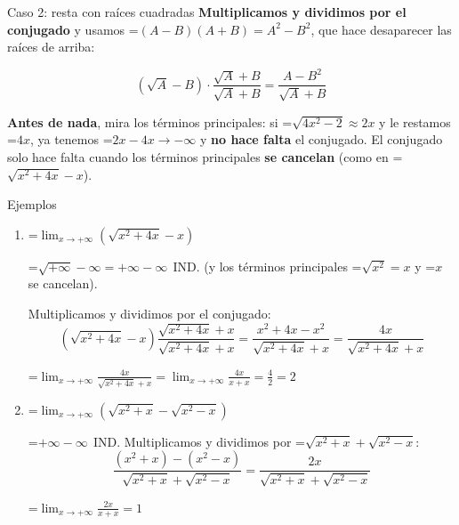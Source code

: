 \documentclass[11pt,a4paper]{article}
\newcommand{\fmm}[1]{\setbox0=\hbox{$#1$}\ifdim\wd0>\linewidth\[#1\]\else\mbox{\box0}\fi}
\newcommand{\fmuline}[1]{\textbf{\color{fmaccent}#1}}
\begin{document}
  
\begin{fmdef}{Caso 2: resta con raíces cuadradas}
\textbf{Multiplicamos y dividimos por el conjugado} y usamos \fmm{(A-B)(A+B)=A^2-B^2}, que hace desaparecer las raíces de arriba:

      
\[\left(\sqrt{A}-B\right)\cdot\frac{\sqrt{A}+B}{\sqrt{A}+B}=\frac{A-B^2}{\sqrt{A}+B}\]

      
\begin{fmnote}\fmuline{Antes de nada}, mira los términos principales: si \fmm{\sqrt{4x^2-2}\approx2x} y le restamos \fmm{4x}, ya tenemos \fmm{2x-4x\to-\infty} y \textbf{no hace falta} el conjugado. El conjugado solo hace falta cuando los términos principales \textbf{se cancelan} (como en \fmm{\sqrt{x^2+4x}-x}).\end{fmnote}
\end{fmdef}

  
\begin{fmex}{Ejemplos}
\begin{enumerate}[label=\textbf{\arabic*.},leftmargin=*]
\item \fmm{\displaystyle\lim_{x\to+\infty}\left(\sqrt{x^2+4x}-x\right)}
          

            

\fmm{\sqrt{+\infty}-\infty=+\infty-\infty\ \ \text{IND.}} (y los términos principales \fmm{\sqrt{x^2}=x} y \fmm{x} se cancelan).

            

Multiplicamos y dividimos por el conjugado: 
\[\left(\sqrt{x^2+4x}-x\right)\frac{\sqrt{x^2+4x}+x}{\sqrt{x^2+4x}+x}=\frac{x^2+4x-x^2}{\sqrt{x^2+4x}+x}=\frac{4x}{\sqrt{x^2+4x}+x}\]

            

\fmm{\displaystyle\lim_{x\to+\infty}\frac{4x}{\sqrt{x^2+4x}+x}=\lim_{x\to+\infty}\frac{4x}{x+x}=\frac{4}{2}=2}
\item \fmm{\displaystyle\lim_{x\to+\infty}\left(\sqrt{x^2+x}-\sqrt{x^2-x}\right)}
          

            

\fmm{+\infty-\infty\ \ \text{IND.}} Multiplicamos y dividimos por \fmm{\sqrt{x^2+x}+\sqrt{x^2-x}}: 
\[\frac{(x^2+x)-(x^2-x)}{\sqrt{x^2+x}+\sqrt{x^2-x}}=\frac{2x}{\sqrt{x^2+x}+\sqrt{x^2-x}}\]

            

\fmm{\displaystyle\lim_{x\to+\infty}\frac{2x}{x+x}=1}
\end{enumerate}
\end{fmex}
\end{document}
